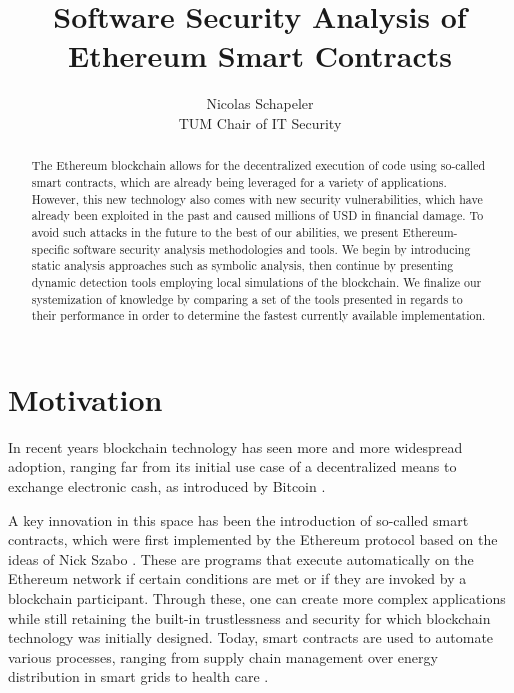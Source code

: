 \documentclass[letterpaper,twocolumn,10pt]{article}
\begin{document}

\date{}

\title{\Large \bf Software Security Analysis of Ethereum Smart Contracts}

\author{
{\rm Nicolas Schapeler}\\
TUM Chair of IT Security
} %

\maketitle

\begin{abstract}
The Ethereum blockchain allows for the decentralized execution of code using so-called smart contracts, which are already being leveraged for a variety of applications. However, this new technology also comes with new security vulnerabilities, which have already been exploited in the past and caused millions of USD in financial damage.
To avoid such attacks in the future to the best of our abilities, we present Ethereum-specific software security analysis methodologies and tools. We begin by introducing static analysis approaches such as symbolic analysis, then continue by presenting dynamic detection tools employing local simulations of the blockchain. We finalize our systemization of knowledge by comparing a set of the tools presented in regards to their performance in order to determine the fastest currently available implementation.


\end{abstract}


\section{Motivation}
In recent years blockchain technology has seen more and more widespread adoption, ranging far from its initial use case of a decentralized means to exchange electronic cash, as introduced by Bitcoin \cite{nakamoto}. 

A key innovation in this space has been the introduction of so-called smart contracts, which were first implemented by the Ethereum protocol based on the ideas of Nick Szabo \cite{szabo_1996}. These are programs that execute automatically on the Ethereum network if certain conditions are met or if they are invoked by a blockchain participant. Through these, one can create more complex applications while still retaining the built-in trustlessness and security for which blockchain technology was initially designed. Today, smart contracts are used to automate various processes, ranging from supply chain management \cite{bhandari_2018} over energy distribution in smart grids \cite{giannakaris_trakadas_zahariadis_gkonis_papadopoulos_2019} to health care \cite{griggs_ossipova_kohlios_baccarini_howson_hayajneh_2018}. 
\end{document}
